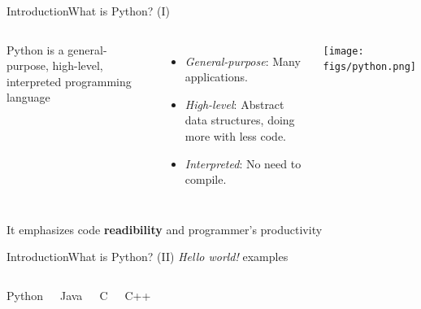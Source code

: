 \documentclass[10pt,compress]{beamer} %
\begin{document}
\begin{frame}{Introduction}{What is Python? (I)}
    \begin{columns}
			Python is a general-purpose, high-level, interpreted programming language
				\begin{itemize}
				\item \textit{General-purpose}: Many applications.
				\item \textit{High-level}: Abstract data structures, doing more with less code.
				\item \textit{Interpreted}: No need to compile.
				\end{itemize}


	        \centering \texttt{[image: figs/python.png]}
	\end{columns}
	\bigskip
			It emphasizes code \textbf{readibility} and programmer's productivity\\
\end{frame}

\begin{frame}[plain]{Introduction}{What is Python? (II)}
\centering \textit{Hello world!} examples
    \begin{columns}
		\vspace{-0.2cm}
		\begin{block}{Python}
		\vspace{-0.2cm}
			
		\end{block}

		\vspace{-0.2cm}
		\begin{block}{Java}
		\vspace{-0.2cm}
			
		\end{block}

		\vspace{-0.2cm}
		\begin{block}{C}
		\vspace{-0.2cm}
			
		\end{block}

		\vspace{-0.2cm}
		\begin{block}{C++}
		\vspace{-0.2cm}
			
		\end{block}
	\end{columns}

\end{frame}
\end{document}
